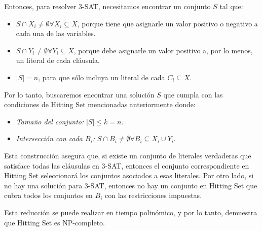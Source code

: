 \documentclass{estilo}
\begin{document}
Entonces, para resolver 3-SAT, necesitamos encontrar un conjunto \(S\) tal que:

\begin{itemize} 
    \item \(S \cap X_i \neq \emptyset \forall X_i \subseteq X\), porque tiene que asignarle un valor positivo o negativo a cada una de las variables.
    \item \(S \cap Y_i \neq \emptyset \forall Y_i \subseteq X\), porque debe asignarle un valor positivo a, por lo menos, un literal de cada cláusula.
    \item \(|S| = n\), para que sólo incluya un literal de cada $C_i \subseteq X$.
\end{itemize}

Por lo tanto, buscaremos encontrar una solución $S$ que cumpla con las condiciones de Hitting Set mencionadas anteriormente donde: 

\begin{itemize} 
    \item \textit{Tamaño del conjunto:} $|S| \leq k = n$.
    \item \textit{Intersección con cada $B_i$:} $S \cap B_i \neq \emptyset \forall B_i \subseteq X_i \cup Y_i$.
\end{itemize}

Esta construcción asegura que, si existe un conjunto de literales verdaderas que satisface todas las cláusulas en 3-SAT, entonces el conjunto correspondiente en Hitting Set seleccionará los conjuntos asociados a esas literales. Por otro lado, si no hay una solución para 3-SAT, entonces no hay un conjunto en Hitting Set que cubra todos los conjuntos en $B_i$ con las restricciones impuestas.

Esta reducción se puede realizar en tiempo polinómico, y por lo tanto, demuestra que Hitting Set es NP-completo.
\end{document}
